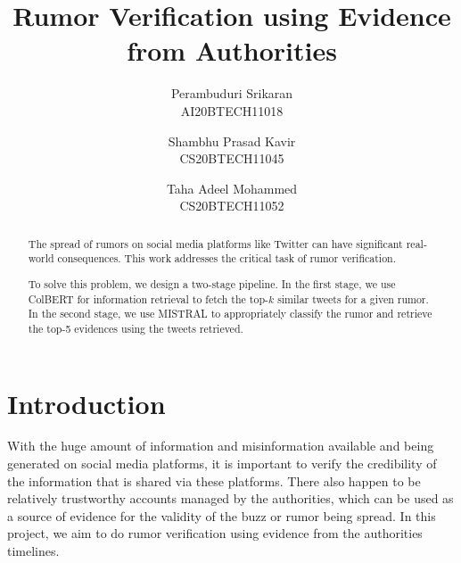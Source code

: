 \documentclass[conference]{IEEEtran}
\begin{document}
\title{Rumor Verification using Evidence from Authorities\\
}

\author{Perambuduri Srikaran\\
AI20BTECH11018\\
\and
Shambhu Prasad Kavir\\
CS20BTECH11045\\
\and
Taha Adeel Mohammed\\
CS20BTECH11052\\
}

\maketitle


\begin{abstract}
The spread of rumors on social media platforms like Twitter can have significant real-world consequences. This work addresses the critical task of rumor verification.

To solve this problem, we design a two-stage pipeline. In the first stage, we use ColBERT for information retrieval to fetch the top-$k$ similar tweets for a given rumor. In the second stage, we use MISTRAL to appropriately classify the rumor and retrieve the top-5 evidences using the tweets retrieved.
\end{abstract}


\section{Introduction}
With the huge amount of information and misinformation available and being generated on social media platforms, it is important to verify the credibility of the information that is shared via these platforms. There also happen to be relatively trustworthy accounts managed by the authorities, which can be used as a source of evidence for the validity of the buzz or rumor being spread. In this project, we aim to do rumor verification using evidence from the authorities timelines. 
\end{document}
